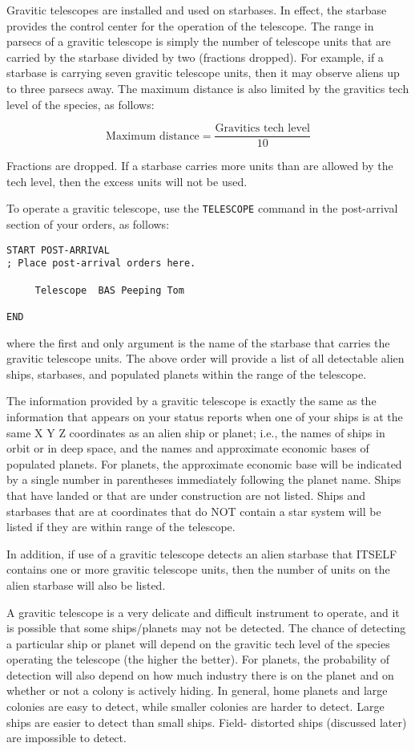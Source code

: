 \documentclass[10pt,titlepage]{article}
\begin{document}
Gravitic telescopes are installed and used on starbases.  In effect, the
starbase provides the control center for the operation of the telescope.  The
range in parsecs of a gravitic telescope is simply the number of telescope
units that are carried by the starbase divided by two (fractions dropped).  For
example, if a starbase is carrying seven gravitic telescope units, then it may
observe aliens up to three parsecs away.  The maximum distance is also limited
by the gravitics tech level of the species, as follows: 


\[
	\textrm{Maximum distance}  =  \dfrac{\textrm{Gravitics tech level}}{10}
\]


Fractions are dropped.  If a starbase carries more units than are allowed by
the tech level, then the excess units will not be used.

To operate a gravitic telescope, use the \texttt{TELESCOPE} command in the post-arrival
section of your orders, as follows:

\begin{verbatim}
START POST-ARRIVAL
; Place post-arrival orders here.

     Telescope	BAS Peeping Tom

END\end{verbatim} 

where the first and only argument is the name of the starbase that carries
the gravitic telescope units.  The above order will provide a list of all
detectable alien ships, starbases, and populated planets within the range
of the telescope.

The information provided by a gravitic telescope is exactly the same as the
information that appears on your status reports when one of your ships is at
the same X Y Z coordinates as an alien ship or planet;  i.e., the names of
ships in orbit or in deep space, and the names and approximate economic bases
of populated planets.  For planets, the approximate economic base will be
indicated by a single number in parentheses immediately following the planet
name.  Ships that have landed or that are under construction are not listed.
Ships and starbases that are at coordinates that do NOT contain a star system
will be listed if they are within range of the telescope.

In addition, if use of a gravitic telescope detects an alien starbase that
ITSELF contains one or more gravitic telescope units, then the number of units
on the alien starbase will also be listed.

A gravitic telescope is a very delicate and difficult instrument to operate,
and it is possible that some ships/planets may not be detected.  The chance of
detecting a particular ship or planet will depend on the gravitic tech level of
the species operating the telescope (the higher the better).  For planets, the
probability of detection will also depend on how much industry there is on the
planet and on whether or not a colony is actively hiding.  In general, home
planets and large colonies are easy to detect, while smaller colonies are
harder to detect.  Large ships are easier to detect than small ships.  Field-
distorted ships (discussed later) are impossible to detect.
\end{document}
